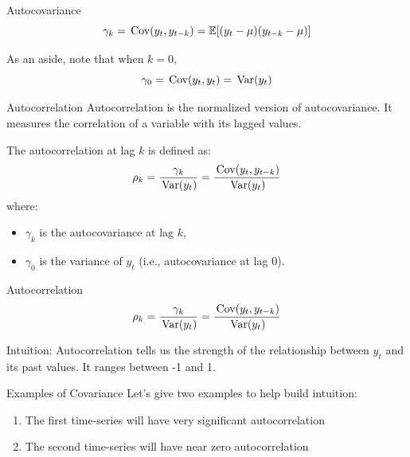 \documentclass[aspectratio=169,t,11pt,table]{beamer}
\begin{document}
\begin{frame}{Autocovariance}
  \vspace*{-\bigskipamount}
  $$
    \gamma_k = \cov{y_t, y_{t-k}} = \expec{(y_t - \mu)(y_{t-k} - \mu)}
  $$

  \bigskip
  As an aside, note that when $k = 0$, 
  $$
    \gamma_0 = \cov{y_t, y_t} = \var{y_t}
  $$
\end{frame}

\begin{frame}{Autocorrelation}
  \alert{Autocorrelation} is the normalized version of autocovariance. It measures the correlation of a variable with its lagged values.

  \bigskip
  The autocorrelation at lag $k$ is defined as:
  $$
    \rho_k = \frac{\gamma_k}{\var{y_t}} = \frac{\cov{y_t, y_{t-k}}}{\var{y_t}}
  $$
  where:
  \begin{itemize}
    \item $\gamma_k$ is the autocovariance at lag $k$,
    \item $\gamma_0$ is the variance of $y_t$ (i.e., autocovariance at lag 0).
  \end{itemize}
\end{frame}

\begin{frame}{Autocorrelation}
  \vspace*{-\bigskipamount}
  $$
    \rho_k = \frac{\gamma_k}{\var{y_t}} = \frac{\cov{y_t, y_{t-k}}}{\var{y_t}}
  $$
  
  \bigskip
  \alert{Intuition}: Autocorrelation tells us the strength of the relationship between $y_t$ and its past values. It ranges between -1 and 1.
\end{frame}

%   

\begin{frame}{Examples of Covariance}
  Let's give two examples to help build intuition:
  \begin{enumerate}
    \item The first time-series will have very significant autocorrelation
    
    \item The second time-series will have near zero autocorrelation
  \end{enumerate}
\end{frame}
\end{document}

